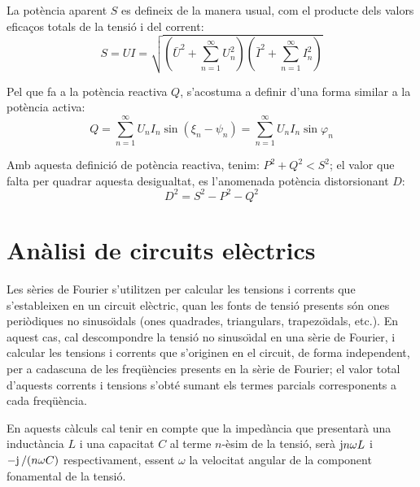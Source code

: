 La pot\`{e}ncia aparent $S$ es defineix de la manera usual, com el
producte dels valors efica\c{c}os totals de la tensi\'{o} i del corrent:
\begin{equation}
    S = U I = \sqrt{ \left(\bar{U}^2 + \sum_{n=1}^{\infty}U^2_n\right)
    \left(\bar{I}^2 + \sum_{n=1}^{\infty}I^2_n\right) }
\end{equation}

Pel que fa  a la pot\`{e}ncia reactiva $Q$, s'acostuma  a definir d'una
forma similar a la pot\`{e}ncia activa:
\begin{equation}
    Q = \sum_{n=1}^\infty U_n I_n
    \sin(\xi_n-\psi_n) =  \sum_{n=1}^\infty U_n I_n
    \sin \varphi_n
\end{equation}

Amb aquesta definici\'{o} de pot\`{e}ncia reactiva, tenim: $P^2+Q^2 < S^2$;
el valor que falta per quadrar aquesta desigualtat, es l'anomenada
pot\`{e}ncia distorsionant $D$:
\begin{equation}
    D^2 = S^2 - P^2 - Q^2
\end{equation}

\section{An\`{a}lisi de circuits el\`{e}ctrics}

Les s\`{e}ries de Fourier s'utilitzen per calcular les tensions i
corrents que s'estableixen en un circuit el\`{e}ctric, quan les fonts de
tensi\'{o} presents  s\'{o}n ones peri\`{o}diques no sinuso\"{\i}dals (ones
quadrades, triangulars, trapezo\"{\i}dals, etc.). En aquest cas, cal
descompondre la tensi\'{o} no sinuso\"{\i}dal en una s\`{e}rie de Fourier, i
calcular les tensions i corrents que s'originen en el circuit, de
forma independent, per a cadascuna de les freq\"{u}\`{e}ncies presents en la
s\`{e}rie de Fourier; el valor total d'aquests corrents i tensions
s'obt\'{e} sumant els termes parcials corresponents a cada freq\"{u}\`{e}ncia.

En aquests c\`{a}lculs cal tenir en compte que la imped\`{a}ncia que
presentar\`{a} una induct\`{a}ncia $L$ i una capacitat $C$ al terme
$n$-\`{e}sim de la tensi\'{o}, ser\`{a} $\mathrm{j} n \omega L$ i $-\mathrm{j}\,/(n\omega C)$
respectivament, essent $\omega$ la velocitat angular de la component
fonamental de la tensi\'{o}.

